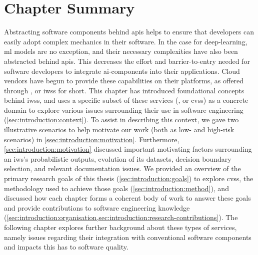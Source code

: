 \section{Chapter Summary}

Abstracting software components behind \glspl{api} helps to ensure that developers can easily adopt complex mechanics in their software. In the case for deep-learning, \gls{ml} models are no exception, and their necessary complexities have also been abstracted behind \glspl{api}. This decreases the effort and barrier-to-entry needed for software developers to integrate \gls{ai}-components into their applications. Cloud vendors have begun to provide these capabilities on their platforms, as  offered through , or \glspl{iws} for short. This chapter has introduced foundational concepts behind \glspl{iws}, and uses a specific subset of these services (, or \glspl{cvs}) as a concrete domain to explore various issues surrounding their use in software engineering (\cref{sec:introduction:context}). To assist in describing this context, we gave two illustrative scenarios to help motivate our work (both as low- and high-risk scenarios) in \cref{ssec:introduction:motivation}. Furthermore, \cref{sec:introduction:motivation} discussed important motivating factors surrounding an \gls{iws}'s probabilistic outputs, evolution of its datasets, decision boundary selection, and relevant documentation issues.  We provided an overview of the primary research goals of this thesis (\cref{sec:introduction:goals}) to explore \glspl{cvs}, the methodology used to achieve those goals (\cref{sec:introduction:method}), and  discussed how each chapter forms a coherent body of work to answer these goals and provide contributions to software engineering knowledge (\cref{sec:introduction:organisation,sec:introduction:research-contributions}). The following chapter explores further background about these types of services, namely issues regarding their integration with conventional software components and impacts this has to software quality.

